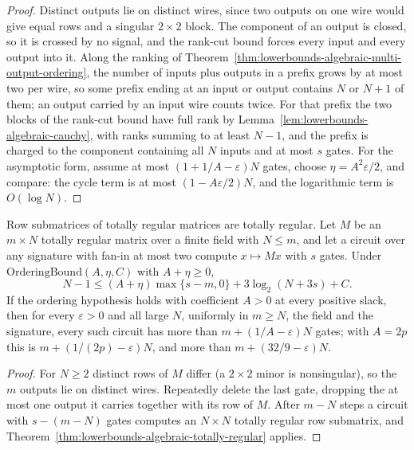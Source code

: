 \begin{proof}
  \leanok
  Distinct outputs lie on distinct wires, since two outputs on one wire would
  give equal rows and a singular $2\times2$ block. The component of an output
  is closed, so it is crossed by no signal, and the rank-cut bound forces
  every input and every output into it. Along the ranking of
  Theorem~\ref{thm:lowerbounds-algebraic-multi-output-ordering}, the number
  of inputs plus outputs in a prefix grows by at most two per wire, so some
  prefix ending at an input or output contains $N$ or $N+1$ of them; an
  output carried by an input wire counts twice. For that prefix the two
  blocks of the rank-cut bound have full rank by
  Lemma~\ref{lem:lowerbounds-algebraic-cauchy}, with ranks summing to at
  least $N-1$, and the prefix is charged to the component containing all
  $N$ inputs and at most $s$ gates. For the asymptotic form, assume at most
  $(1+1/A-\varepsilon)N$ gates, choose $\eta=A^2\varepsilon/2$, and compare:
  the cycle term is at most $(1-A\varepsilon/2)N$, and the logarithmic term
  is $O(\log N)$.
\end{proof}

\begin{theorem}
  \label{thm:lowerbounds-algebraic-totally-regular-rect}
  \leanok
  Row submatrices of totally regular matrices are totally regular. Let $M$ be
  an $m\times N$ totally regular matrix over a finite field with $N\le m$, and
  let a circuit over any signature with fan-in at most two compute
  $x\mapsto Mx$ with $s$ gates. Under $\mathrm{OrderingBound}(A,\eta,C)$ with
  $A+\eta\ge0$,
  \[
    N-1 \le (A+\eta)\max\{s-m,0\} + 3\log_2(N+3s) + C .
  \]
  If the ordering hypothesis holds with coefficient $A>0$ at every positive
  slack, then for every $\varepsilon>0$ and all large $N$, uniformly in
  $m\ge N$, the field and the signature, every such circuit has more than
  $m+(1/A-\varepsilon)N$ gates; with $A=2p$ this is
  $m+(1/(2p)-\varepsilon)N$, and more than $m+(32/9-\varepsilon)N$.
\end{theorem}
\begin{proof}
  \leanok
  For $N\ge2$ distinct rows of $M$ differ (a $2\times2$ minor is
  nonsingular), so the $m$ outputs lie on distinct wires. Repeatedly delete
  the last gate, dropping the at most one output it carries together with its
  row of $M$. After $m-N$ steps a circuit with $s-(m-N)$ gates computes an
  $N\times N$ totally regular row submatrix, and
  Theorem~\ref{thm:lowerbounds-algebraic-totally-regular} applies.
\end{proof}

